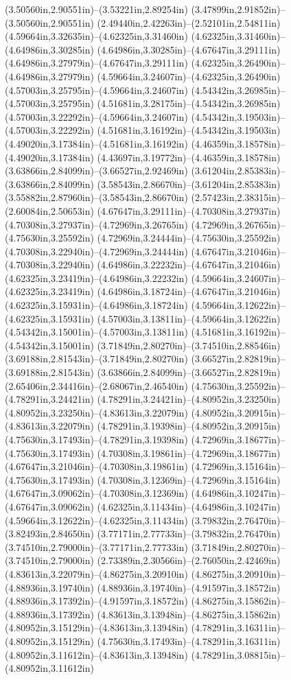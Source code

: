 (3.50560in,2.90551in)--(3.53221in,2.89254in) (3.47899in,2.91852in)--(3.50560in,2.90551in) (2.49440in,2.42263in)--(2.52101in,2.54811in) (4.59664in,3.32635in)--(4.62325in,3.31460in) (4.62325in,3.31460in)--(4.64986in,3.30285in) (4.64986in,3.30285in)--(4.67647in,3.29111in) (4.64986in,3.27979in)--(4.67647in,3.29111in) (4.62325in,3.26490in)--(4.64986in,3.27979in) (4.59664in,3.24607in)--(4.62325in,3.26490in) (4.57003in,3.25795in)--(4.59664in,3.24607in) (4.54342in,3.26985in)--(4.57003in,3.25795in) (4.51681in,3.28175in)--(4.54342in,3.26985in) (4.57003in,3.22292in)--(4.59664in,3.24607in) (4.54342in,3.19503in)--(4.57003in,3.22292in) (4.51681in,3.16192in)--(4.54342in,3.19503in) (4.49020in,3.17384in)--(4.51681in,3.16192in) (4.46359in,3.18578in)--(4.49020in,3.17384in) (4.43697in,3.19772in)--(4.46359in,3.18578in) (3.63866in,2.84099in)--(3.66527in,2.92469in) (3.61204in,2.85383in)--(3.63866in,2.84099in) (3.58543in,2.86670in)--(3.61204in,2.85383in) (3.55882in,2.87960in)--(3.58543in,2.86670in) (2.57423in,2.38315in)--(2.60084in,2.50653in) (4.67647in,3.29111in)--(4.70308in,3.27937in) (4.70308in,3.27937in)--(4.72969in,3.26765in) (4.72969in,3.26765in)--(4.75630in,3.25592in) (4.72969in,3.24444in)--(4.75630in,3.25592in) (4.70308in,3.22940in)--(4.72969in,3.24444in) (4.67647in,3.21046in)--(4.70308in,3.22940in) (4.64986in,3.22232in)--(4.67647in,3.21046in) (4.62325in,3.23419in)--(4.64986in,3.22232in) (4.59664in,3.24607in)--(4.62325in,3.23419in) (4.64986in,3.18724in)--(4.67647in,3.21046in) (4.62325in,3.15931in)--(4.64986in,3.18724in) (4.59664in,3.12622in)--(4.62325in,3.15931in) (4.57003in,3.13811in)--(4.59664in,3.12622in) (4.54342in,3.15001in)--(4.57003in,3.13811in) (4.51681in,3.16192in)--(4.54342in,3.15001in) (3.71849in,2.80270in)--(3.74510in,2.88546in) (3.69188in,2.81543in)--(3.71849in,2.80270in) (3.66527in,2.82819in)--(3.69188in,2.81543in) (3.63866in,2.84099in)--(3.66527in,2.82819in) (2.65406in,2.34416in)--(2.68067in,2.46540in) (4.75630in,3.25592in)--(4.78291in,3.24421in) (4.78291in,3.24421in)--(4.80952in,3.23250in) (4.80952in,3.23250in)--(4.83613in,3.22079in) (4.80952in,3.20915in)--(4.83613in,3.22079in) (4.78291in,3.19398in)--(4.80952in,3.20915in) (4.75630in,3.17493in)--(4.78291in,3.19398in) (4.72969in,3.18677in)--(4.75630in,3.17493in) (4.70308in,3.19861in)--(4.72969in,3.18677in) (4.67647in,3.21046in)--(4.70308in,3.19861in) (4.72969in,3.15164in)--(4.75630in,3.17493in) (4.70308in,3.12369in)--(4.72969in,3.15164in) (4.67647in,3.09062in)--(4.70308in,3.12369in) (4.64986in,3.10247in)--(4.67647in,3.09062in) (4.62325in,3.11434in)--(4.64986in,3.10247in) (4.59664in,3.12622in)--(4.62325in,3.11434in) (3.79832in,2.76470in)--(3.82493in,2.84650in) (3.77171in,2.77733in)--(3.79832in,2.76470in) (3.74510in,2.79000in)--(3.77171in,2.77733in) (3.71849in,2.80270in)--(3.74510in,2.79000in) (2.73389in,2.30566in)--(2.76050in,2.42469in) (4.83613in,3.22079in)--(4.86275in,3.20910in) (4.86275in,3.20910in)--(4.88936in,3.19740in) (4.88936in,3.19740in)--(4.91597in,3.18572in) (4.88936in,3.17392in)--(4.91597in,3.18572in) (4.86275in,3.15862in)--(4.88936in,3.17392in) (4.83613in,3.13948in)--(4.86275in,3.15862in) (4.80952in,3.15129in)--(4.83613in,3.13948in) (4.78291in,3.16311in)--(4.80952in,3.15129in) (4.75630in,3.17493in)--(4.78291in,3.16311in) (4.80952in,3.11612in)--(4.83613in,3.13948in) (4.78291in,3.08815in)--(4.80952in,3.11612in) 
